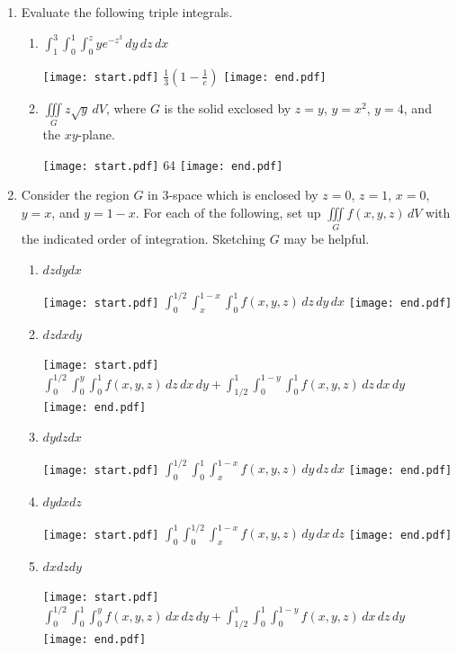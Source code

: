 \documentclass[12pt]{article}
\begin{document}
\begin{enumerate}

\item Evaluate the following triple integrals.

\begin{enumerate}

\item $\int_1^3 \int_0^1 \int_0^z ye^{-z^3} \,dy\,dz\,dx$

\texttt{[image: start.pdf]}
{{$\frac{1}{3}\left(1-\frac{1}{e}\right)$}}
\texttt{[image: end.pdf]}


\item $\iiint \limits_{G} z\sqrt{y} \,dV$, where $G$ is the solid exclosed by $z=y$, $y=x^2$, $y=4$, and the $xy$-plane.

\texttt{[image: start.pdf]}
{{64}}
\texttt{[image: end.pdf]}


\end{enumerate}

\item Consider the region $G$ in 3-space which is enclosed by $z=0$, $z=1$, $x=0$, $y=x$, and $y=1-x$.  For each of the following, set up $\iiint \limits_{G} f(x,y,z)\,dV$ with the indicated order of integration.  Sketching $G$ may be helpful.

\begin{enumerate}

\item $dzdydx$

\texttt{[image: start.pdf]}
{{$\int_0^{1/2} \int_x^{1-x} \int_0^1 f(x,y,z) \,dz\,dy\,dx$}}
\texttt{[image: end.pdf]}


\item $dzdxdy$

\texttt{[image: start.pdf]}
{{$\int_0^{1/2} \int_0^y \int_0^1 f(x,y,z) \,dz\,dx\,dy+\int_{1/2}^1 \int_0^{1-y} \int_0^1 f(x,y,z)\,dz\,dx\,dy$}}
\texttt{[image: end.pdf]}


\item $dydzdx$

\texttt{[image: start.pdf]}
{{$\int_0^{1/2} \int_0^1 \int_x^{1-x} f(x,y,z) \,dy\,dz\,dx$}}
\texttt{[image: end.pdf]}


\item $dydxdz$

\texttt{[image: start.pdf]}
{{$\int_0^1 \int_0^{1/2} \int_x^{1-x} f(x,y,z) \,dy\,dx\,dz$}}
\texttt{[image: end.pdf]}


\item $dxdzdy$

\texttt{[image: start.pdf]}
{{$\int_0^{1/2} \int_0^1 \int_0^y f(x,y,z) \,dx\,dz\,dy+\int_{1/2}^1 \int_0^1 \int_0^{1-y} f(x,y,z)\,dx\,dz\,dy$}}
\texttt{[image: end.pdf]}



\end{enumerate}
\end{enumerate}
\end{document}
